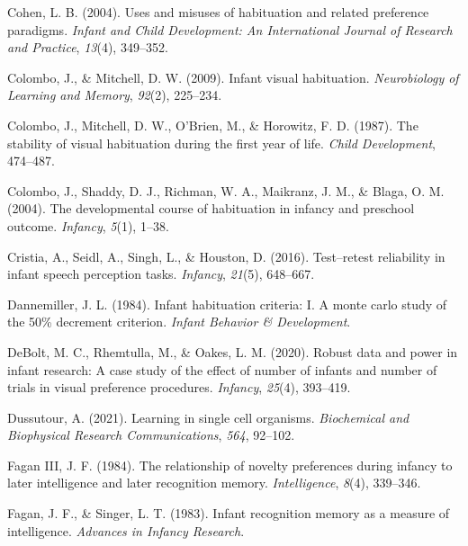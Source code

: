 \documentclass[10pt, letterpaper]{article}
\newenvironment{CSLReferences}%
  {}%
  {\par}
\begin{document}
\begin{CSLReferences}{1}{0}
\leavevmode{}%
Cohen, L. B. (2004). Uses and misuses of habituation and related
preference paradigms. \emph{Infant and Child Development: An
International Journal of Research and Practice}, \emph{13}(4), 349--352.

\leavevmode{}%
Colombo, J., \& Mitchell, D. W. (2009). Infant visual habituation.
\emph{Neurobiology of Learning and Memory}, \emph{92}(2), 225--234.

\leavevmode{}%
Colombo, J., Mitchell, D. W., O'Brien, M., \& Horowitz, F. D. (1987).
The stability of visual habituation during the first year of life.
\emph{Child Development}, 474--487.

\leavevmode{}%
Colombo, J., Shaddy, D. J., Richman, W. A., Maikranz, J. M., \& Blaga,
O. M. (2004). The developmental course of habituation in infancy and
preschool outcome. \emph{Infancy}, \emph{5}(1), 1--38.

\leavevmode{}%
Cristia, A., Seidl, A., Singh, L., \& Houston, D. (2016). Test--retest
reliability in infant speech perception tasks. \emph{Infancy},
\emph{21}(5), 648--667.

\leavevmode{}%
Dannemiller, J. L. (1984). Infant habituation criteria: I. A monte carlo
study of the 50\% decrement criterion. \emph{Infant Behavior \&
Development}.

\leavevmode{}%
DeBolt, M. C., Rhemtulla, M., \& Oakes, L. M. (2020). Robust data and
power in infant research: A case study of the effect of number of
infants and number of trials in visual preference procedures.
\emph{Infancy}, \emph{25}(4), 393--419.

\leavevmode{}%
Dussutour, A. (2021). Learning in single cell organisms.
\emph{Biochemical and Biophysical Research Communications}, \emph{564},
92--102.

\leavevmode{}%
Fagan III, J. F. (1984). The relationship of novelty preferences during
infancy to later intelligence and later recognition memory.
\emph{Intelligence}, \emph{8}(4), 339--346.

\leavevmode{}%
Fagan, J. F., \& Singer, L. T. (1983). Infant recognition memory as a
measure of intelligence. \emph{Advances in Infancy Research}.


\end{CSLReferences}
\end{document}
